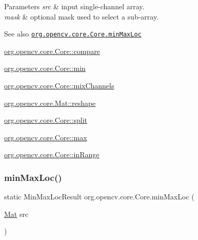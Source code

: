 \begin{DoxyParams}{Parameters}
{\em src} & input single-\/channel array. \\
\hline
{\em mask} & optional mask used to select a sub-\/array.\\
\hline
\end{DoxyParams}
\begin{DoxySeeAlso}{See also}
\href{http://docs.opencv.org/modules/core/doc/operations_on_arrays.html#minmaxloc}{\tt org.\+opencv.\+core.\+Core.\+min\+Max\+Loc} 

\mbox{\hyperlink{classorg_1_1opencv_1_1core_1_1_core_a6f1dc64655b7da1219d82f809efb7e16}{org.\+opencv.\+core.\+Core\+::compare}} 

\mbox{\hyperlink{classorg_1_1opencv_1_1core_1_1_core_a24561bfde2c7fe7d2b7bee9d5ba8c92e}{org.\+opencv.\+core.\+Core\+::min}} 

\mbox{\hyperlink{classorg_1_1opencv_1_1core_1_1_core_a812a71941c37c615cb474bff0eacbb2e}{org.\+opencv.\+core.\+Core\+::mix\+Channels}} 

\mbox{\hyperlink{classorg_1_1opencv_1_1core_1_1_mat_ac272e7518dba0da8e7480df63163040b}{org.\+opencv.\+core.\+Mat\+::reshape}} 

\mbox{\hyperlink{classorg_1_1opencv_1_1core_1_1_core_aa22f046c4f14cda50c10f5d22ffdbb26}{org.\+opencv.\+core.\+Core\+::split}} 

\mbox{\hyperlink{classorg_1_1opencv_1_1core_1_1_core_aae8ad4feaca1ca8234bd88cbf9090cf5}{org.\+opencv.\+core.\+Core\+::max}} 

\mbox{\hyperlink{classorg_1_1opencv_1_1core_1_1_core_adda843559663a35e9a710c93b1f86096}{org.\+opencv.\+core.\+Core\+::in\+Range}} 
\end{DoxySeeAlso}
\mbox{\label{classorg_1_1opencv_1_1core_1_1_core_af85a1994a360e2c955622a2583de1d81}} 
\subsubsection{\texorpdfstring{min\+Max\+Loc()}{minMaxLoc()}\hspace{0.1cm}{\footnotesize\ttfamily [2/2]}}
{\footnotesize\ttfamily static Min\+Max\+Loc\+Result org.\+opencv.\+core.\+Core.\+min\+Max\+Loc (\begin{DoxyParamCaption}\item[{\mbox{\hyperlink{classorg_1_1opencv_1_1core_1_1_mat}{Mat}}}]{src }\end{DoxyParamCaption})\hspace{0.3cm}{\ttfamily [static]}}

